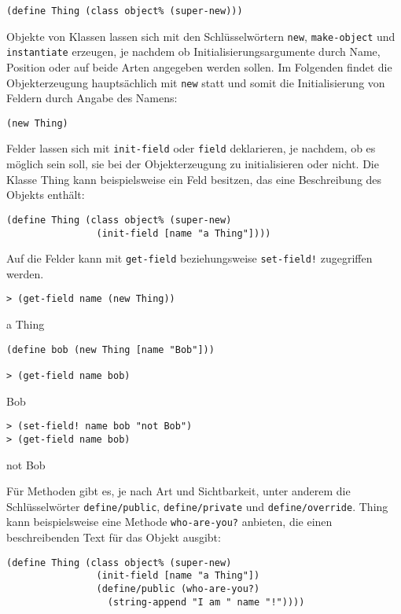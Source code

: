 \begin{lstlisting}
(define Thing (class object% (super-new)))
\end{lstlisting}

Objekte von Klassen lassen sich mit den Schlüsselwörtern \texttt{new}, \texttt{make-object} und \texttt{instantiate} erzeugen, je nachdem ob Initialisierungsargumente durch Name, Position oder auf beide Arten angegeben werden sollen. Im Folgenden findet die Objekterzeugung hauptsächlich mit \texttt{new} statt und somit die Initialisierung
von Feldern durch Angabe des Namens:

\begin{lstlisting}
(new Thing)
\end{lstlisting}

Felder lassen sich mit \texttt{init-field} oder \texttt{field} deklarieren, je nachdem, ob es möglich sein soll, sie bei der Objekterzeugung zu initialisieren oder nicht. Die Klasse Thing kann beispielsweise ein Feld besitzen, das eine Beschreibung des Objekts enthält:

\begin{lstlisting}
(define Thing (class object% (super-new)
                (init-field [name "a Thing"])))
\end{lstlisting}

Auf die Felder kann mit \texttt{get-field} beziehungsweise \texttt{set-field!} zugegriffen werden. 

\begin{lstlisting}
> (get-field name (new Thing))
\end{lstlisting}
{\routput {\qq}a Thing{\qq}}

\begin{lstlisting}
(define bob (new Thing [name "Bob"]))

> (get-field name bob)
\end{lstlisting}
{\routput {\qq}Bob{\qq}}

\begin{lstlisting}
> (set-field! name bob "not Bob")
> (get-field name bob)
\end{lstlisting}
{\routput {\qq}not Bob{\qq}}

Für Methoden gibt es, je nach Art und Sichtbarkeit, unter anderem die Schlüsselwörter \texttt{define/public}, \texttt{define/private} und \texttt{define/override}. Thing kann beispielsweise eine Methode \texttt{who-are-you?} anbieten, die einen beschreibenden Text für das Objekt ausgibt:

\begin{lstlisting}
(define Thing (class object% (super-new)
                (init-field [name "a Thing"])
                (define/public (who-are-you?) 
                  (string-append "I am " name "!"))))
\end{lstlisting}

